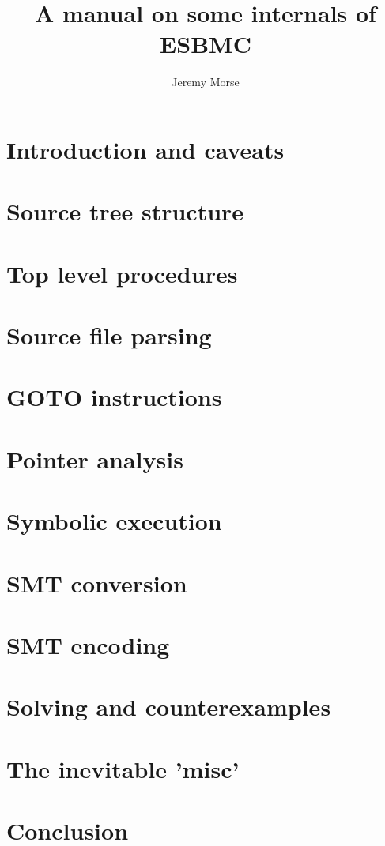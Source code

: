 \documentclass{article}
\begin{document}
\author{Jeremy Morse}
\title{A manual on some internals of ESBMC}
\maketitle
\section{Introduction and caveats}
\section{Source tree structure}
\section{Top level procedures}
\section{Source file parsing}
\section{GOTO instructions}
\section{Pointer analysis}
\section{Symbolic execution}
\section{SMT conversion}
\section{SMT encoding}
\section{Solving and counterexamples}
\section{The inevitable 'misc'}
\section{Conclusion}
\end{document}
